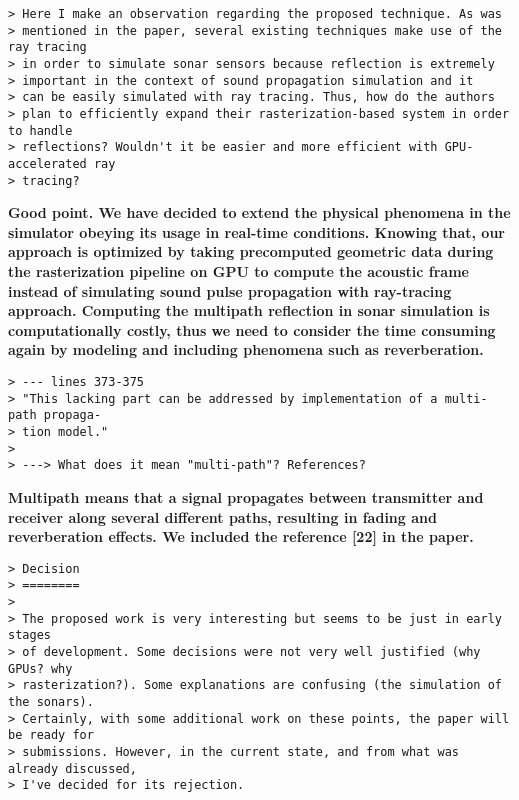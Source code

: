 \documentclass{article}
\begin{document}

\begin{verbatim}
> Here I make an observation regarding the proposed technique. As was
> mentioned in the paper, several existing techniques make use of the ray tracing
> in order to simulate sonar sensors because reflection is extremely
> important in the context of sound propagation simulation and it
> can be easily simulated with ray tracing. Thus, how do the authors
> plan to efficiently expand their rasterization-based system in order to handle
> reflections? Wouldn't it be easier and more efficient with GPU-accelerated ray
> tracing?
\end{verbatim}

\textbf{Good point. We have decided to extend the physical phenomena in the
simulator obeying its usage in real-time conditions. Knowing that, our approach
is optimized by taking precomputed geometric data during the rasterization
pipeline on GPU to compute the acoustic frame instead of simulating sound pulse propagation
with ray-tracing approach. Computing the multipath reflection in sonar simulation
is computationally costly, thus we need to consider the time consuming again by modeling
and including phenomena such as reverberation.}

\begin{verbatim}
> --- lines 373-375
> "This lacking part can be addressed by implementation of a multi-path propaga-
> tion model."
>
> ---> What does it mean "multi-path"? References?
\end{verbatim}

\textbf{Multipath means that a signal propagates between transmitter and receiver along
several different paths, resulting in fading and reverberation effects. We included
the reference [22] in the paper.}

\begin{verbatim}
> Decision
> ========
>
> The proposed work is very interesting but seems to be just in early stages
> of development. Some decisions were not very well justified (why GPUs? why
> rasterization?). Some explanations are confusing (the simulation of the sonars).
> Certainly, with some additional work on these points, the paper will be ready for
> submissions. However, in the current state, and from what was already discussed,
> I've decided for its rejection.
\end{verbatim}
\end{document}

